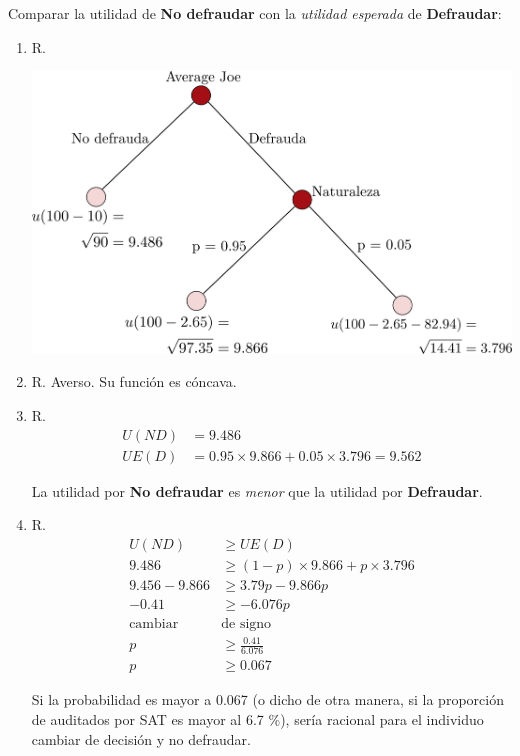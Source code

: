 \documentclass[12pt]{scrartcl} %
\begin{document}
\begin{Exercise}[name={Respuesta}]



Comparar la utilidad de \textbf{No defraudar} con la \textit{utilidad esperada} de \textbf{Defraudar}:

\begin{enumerate}
  \setlength{\itemsep}{0pt}
  \setlength{\parskip}{0pt}
  \setlength{\parsep}{0pt}
  \item R. 
  \begin{center}
    \includegraphics[scale=0.65]{p2tarea1a.png}
  \end{center}
  \item R. Averso. Su función es cóncava. 
  \item R. 
  \begin{align*}
    U(ND) &= 9.486\\
    UE(D) &= 0.95 \times 9.866 + 0.05 \times 3.796 = 9.562
  \end{align*}
  
  La utilidad por \textbf{No defraudar} es \textit{menor} que la utilidad por \textbf{Defraudar}.
  \item R. 
  \begin{align*}
    U(ND) &\geq UE(D) \\ 
    9.486 &\geq (1-p) \times 9.866 + p \times 3.796 \\ 
    9.456-9.866 &\geq 3.79p - 9.866p \\
    -0.41 &\geq -6.076p\\
    \text{cambiar } &\text{de signo} \\
    p &\geq \frac{0.41}{6.076} \\
    p &\geq 0.067
  \end{align*}
 
Si la probabilidad es mayor a 0.067 (o dicho de otra manera, si la proporción de auditados por SAT es mayor al 6.7 \%), sería racional para el individuo cambiar de decisión y no defraudar.

\end{enumerate} 

\end{Exercise}
\end{document}
